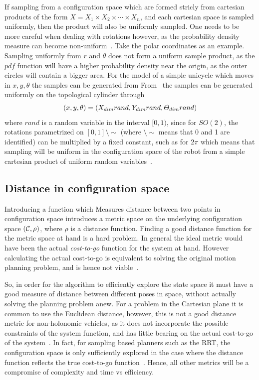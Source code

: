 If sampling from a configuration space which are formed stricly from cartesian
products of the form \(X = X_1\times X_2\times \cdots \times X_n\), and each cartesian
space is sampled uniformly, then the product will also be uniformly sampled. One
needs to be more careful when dealing with rotations however, as the probability
density measure can become non-uniform~\cite{Lav06}. Take the polar coordinates
as an example. Sampling uniformly from \(r\) and \(\theta\) does not form a
uniform sample product, as the \(pdf\) function will have a higher probability
density near the origin, as the outer circles will contain a bigger area. For
the model of a simple unicycle which moves in \(x,y,\theta\) the samples can be
generated from From~\cite{kuffnerEffectiveSamplingDistance2004} the samples can
be generated uniformly on the topological cylinder through
\[
  (x,y,\theta) = (\mathnormal{X}_{dim}rand, \mathnormal{Y}_{dim}rand, \mathnormal{\Theta}_{dim}rand)
\]
where \(rand\) is a random variable in the interval \([0,1)\), since for
\(SO(2)\), the rotations parametrized on \([0,1]\setminus\sim\) (where
\(\setminus\sim\) means that 0 and 1 are identified) can be multiplied by a
fixed constant, such as for \(2\pi\) which means that sampling will be uniform
in the configuration space of the robot from a simple cartesian product of
uniform random variables~\cite{Lav06}.

\subsection{Distance in configuration space}

Introducing a function which Measures distance between two points in
configuration space introduces a metric space on the underlying configuration
space \((\mathcal{C}{},\rho)\), where \(\rho\) is a distance
function. Finding a good distance function for the metric space at hand is a
hard problem. In general the ideal metric would have been the actual
\textit{cost-to-go} function for the system at hand. However calculating the
actual cost-to-go is equivalent to solving the original motion planning problem,
and is hence not viable~\cite{pengchengReducingMetricSensitivity2001}.

So, in order for the \rrtfunnel{} algorithm to efficiently explore the state
space it must have a good measure of distance between different poses in space,
without actually solving the planning problem anew. For a problem in the
Cartesian plane it is common to use the Euclidean distance, however, this is not
a good distance metric for non-holonomic vehicles, as it does not incorporate
the possible constraints of the system function, and has little bearing on the
actual cost-to-go of the system~\cite{parkFeedbackMotionPlanning2015}. In fact,
for sampling based planners such as the \ac{RRT}, the configuration space is
only sufficiently explored in the case where the distance function reflects the
true cost-to-go function~\cite{pengchengReducingMetricSensitivity2001}. Hence,
all other metrics will be a compromise of complexity and time vs efficiency.

